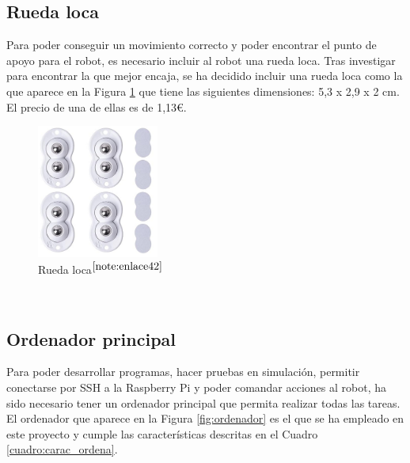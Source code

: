 \setcounter{footnote}{41} %

\subsection{Rueda loca}

Para poder conseguir un movimiento correcto y poder encontrar el punto de apoyo para el robot, es necesario incluir al robot una rueda loca. Tras investigar para encontrar la que mejor encaja, se ha decidido incluir una rueda loca como la que aparece en la Figura \ref{fig:ruedaloca} que tiene las siguientes dimensiones: 5,3 x 2,9 x 2 cm. El precio de una de ellas es de 1,13€.

\begin{figure} [h!]
	\begin{center}
		\includegraphics[width=4cm]{figs/ruedaloca.png}
	\end{center}
	\caption{Rueda loca$^{\ref{note:enlace42}}$} 
	\label{fig:ruedaloca}
\end{figure}\

\setcounter{footnote}{42} %

\subsection{Ordenador principal}

Para poder desarrollar programas, hacer pruebas en simulación, permitir conectarse por SSH a la Raspberry Pi y poder comandar acciones al robot, ha sido necesario tener un ordenador principal que permita realizar todas las tareas. El ordenador que aparece en la Figura \ref{fig:ordenador} es el que se ha empleado en este proyecto y cumple las características descritas en el Cuadro \ref{cuadro:carac_ordena}.



